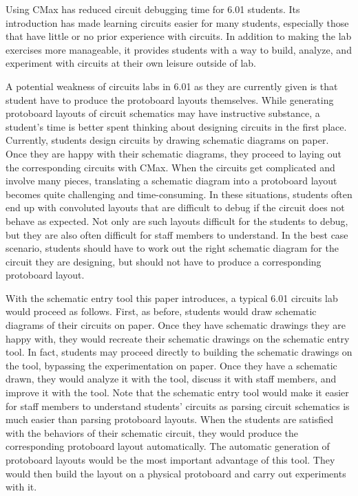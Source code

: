 Using CMax has reduced circuit debugging time for 6.01 students.
Its introduction has made
learning circuits easier for many students, especially those that
have little or no prior experience with circuits. In addition to making the lab
exercises more manageable, it provides students with a way to
build, analyze, and experiment with circuits at their own leisure outside of lab.

A potential weakness of circuits labs in 6.01 as they are currently given is
that student have to produce the protoboard layouts themselves.
While generating protoboard layouts
of circuit schematics may have instructive substance, a student's time is better
spent thinking about designing circuits in the first place.
Currently, students design circuits by drawing schematic diagrams on paper.
Once they are happy with
their schematic diagrams, they proceed to laying out the corresponding circuits
with CMax. When the circuits get complicated and involve many pieces,
translating a
schematic diagram into a protoboard layout becomes quite challenging and
time-consuming. In these situations, students often end up with convoluted
layouts that are difficult to debug if the circuit does not behave as expected.
Not only are such layouts difficult for the
students to debug, but they are also often difficult for staff
members to understand. In the best case scenario, students should have to work
out the right schematic diagram for the circuit they are designing,
but should not have to produce a corresponding protoboard layout.

With the schematic entry tool this paper introduces, a typical 6.01 circuits lab
would proceed as follows. First, as before, students would draw schematic
diagrams of their circuits on paper. Once they have
schematic drawings they are happy with, they would recreate their schematic
drawings on the schematic entry tool. In fact, students may proceed directly to
building the schematic drawings on the tool, bypassing the
experimentation on
paper. Once they have a schematic drawn, they would analyze it with the tool,
discuss it with staff members, and improve it with the tool. Note that
the schematic entry tool would make it easier for staff members to understand
students' circuits as parsing circuit schematics is much easier than parsing
protoboard layouts. When the students are
satisfied with the behaviors of their schematic circuit, they would produce the
corresponding protoboard layout automatically. The automatic generation of
protoboard layouts would be
the most important advantage of this tool. They would then build the layout on a
physical protoboard and carry out experiments with it.

